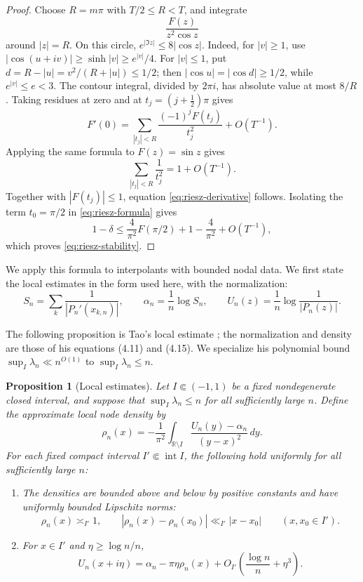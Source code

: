 \documentclass[11pt]{article}
\newtheorem{taoestimates}[theorem]{Proposition}
\theoremstyle{remark}
\numberwithin{equation}{section}
\begin{document}
\begin{proof}
Choose \(R=m\pi\) with \(T/2\le R<T\), and integrate
\[
 \frac{F(z)}{z^2\cos z}
\]
around \(|z|=R\). On this circle, \(e^{|\Im z|}\le8|\cos z|\).
Indeed, for \(|v|\ge1\), use \(|\cos(u+iv)|\ge\sinh|v|\ge e^{|v|}/4\).
For \(|v|\le1\), put \(d=R-|u|=v^2/(R+|u|)\le1/2\); then
\(|\cos u|=|\cos d|\ge1/2\), while \(e^{|v|}\le e<3\).
The contour integral, divided by \(2\pi i\), has absolute value at most
\(8/R\). Taking residues at zero
and at \(t_j=(j+\tfrac12)\pi\) gives
\begin{equation}\label{eq:riesz-formula}
 F'(0)=\sum_{|t_j|<R}\frac{(-1)^jF(t_j)}{t_j^2}+O(T^{-1}).
\end{equation}
Applying the same formula to \(F(z)=\sin z\) gives
\[
 \sum_{|t_j|<R}\frac1{t_j^2}=1+O(T^{-1}).
\]
Together with \(|F(t_j)|\le1\), equation \eqref{eq:riesz-derivative} follows. Isolating the term \(t_0=\pi/2\)
in \eqref{eq:riesz-formula} gives
\[
 1-\delta\le \frac4{\pi^2}F(\pi/2)+1-\frac4{\pi^2}+O(T^{-1}),
\]
which proves \eqref{eq:riesz-stability}.
\end{proof}

We apply this formula to interpolants with bounded nodal data. We first
state the local estimates in the form used here, with the normalization:
\[
 S_n=\sum_k\frac1{|P_n'(x_{k,n})|},\qquad
 \alpha_n=\frac1n\log S_n,\qquad
 U_n(z)=\frac1n\log\frac1{|P_n(z)|}.
\]

The following proposition is Tao's local estimate
\cite[Theorem~4.1(ii), equations (4.6)--(4.7)]{Tao}; the normalization
and density are those of his equations (4.11) and (4.15).
We specialize his polynomial bound \(\sup_I\lambda_n\ll n^{O(1)}\)
to \(\sup_I\lambda_n\le n\).

\begin{taoestimates}[Local estimates]\label{prop:tao}
Let \(I\Subset(-1,1)\) be a fixed nondegenerate closed interval, and
suppose that \(\sup_I\lambda_n\le n\) for all sufficiently large \(n\).
Define the approximate local node density by
\[
 \rho_n(x)=-\frac1{\pi^2}\int_{\mathbb R\setminus I}
                  \frac{U_n(y)-\alpha_n}{(y-x)^2}\,dy.
\]
For each fixed compact interval \(I'\Subset\operatorname{int}I\), the
following hold uniformly for all sufficiently large \(n\):
\begin{enumerate}
\item[(i)] The densities are bounded above and below by positive constants
and have uniformly bounded Lipschitz norms:
\[
 \rho_n(x)\asymp_{I'}1,\qquad
 |\rho_n(x)-\rho_n(x_0)|\ll_{I'}|x-x_0|
 \qquad(x,x_0\in I').
\]
\item[(ii)] For \(x\in I'\) and \(\eta\ge\log n/n\),
\begin{equation}\label{eq:potential}
 U_n(x+i\eta)=\alpha_n-\pi\eta\rho_n(x)
              +O_{I'}\!\left(\frac{\log n}{n}+\eta^3\right).
\end{equation}
\end{enumerate}
\end{taoestimates}
\end{document}
